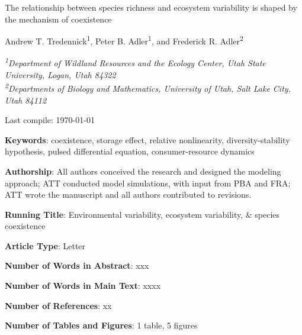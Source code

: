 \documentclass[12pt,]{article}
\title{}
\author{}
\date{}
\begin{document}
\renewcommand\linenumberfont{\normalfont\tiny\sffamily\color{gray}}

 \newcommand{\new}{\textcolor{blue}}

\begin{singlespace}

\begin{centering}

\Large{The relationship between species richness and ecosystem variability is shaped by the mechanism of coexistence}

\bigskip{} \bigskip{}

\renewcommand*{\thefootnote}{\fnsymbol{footnote}}

\normalsize{Andrew T. Tredennick\textsuperscript{1}, Peter B. Adler\textsuperscript{1}, and Frederick R. Adler\textsuperscript{2}}

\bigskip{}

\textit{\small{\textsuperscript{1}Department of Wildland Resources and the Ecology Center, Utah State University, Logan, Utah 84322}} \\
\textit{\small{\textsuperscript{2}Departments of Biology and Mathematics, University of Utah, Salt Lake City, Utah 84112}} 

\end{centering}

\vspace{3em}

Last compile: \today

\noindent \textbf{Keywords}: coexistence, storage effect, relative nonlinearity, diversity-stability hypothesis, pulsed differential equation, consumer-resource dynamics

\noindent \textbf{Authorship}: All authors conceived the research and designed the modeling approach; ATT conducted model simulations, with input from PBA and FRA; ATT wrote the manuscript and all authors contributed to revisions.

\noindent \textbf{Running Title}: Environmental variability, ecosystem variability, \& species coexistence

\noindent \textbf{Article Type}: Letter

\noindent \textbf{Number of Words in Abstract}: xxx

\noindent \textbf{Number of Words in Main Text}: xxxx

\noindent \textbf{Number of References}: xx

\noindent \textbf{Number of Tables and Figures}: 1 table, 5 figures


\end{singlespace}
\end{document}
